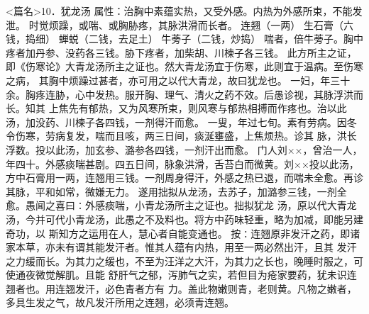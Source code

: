 \documentclass[a4paper,12pt,UTF8,twoside]{ctexbook}
\begin{document}
<篇名>10．犹龙汤
属性：治胸中素蕴实热，又受外感。内热为外感所束，不能发泄。 
时觉烦躁，或喘、或胸胁疼，其脉洪滑而长者。 
连翘（一两） 生石膏（六钱，捣细） 蝉蜕（二钱，去足土） 牛蒡子（二钱，炒捣） 
喘者，倍牛蒡子。胸中疼者加丹参、没药各三钱。胁下疼者，加柴胡、川楝子各三钱。 
此方所主之证，即《伤寒论》大青龙汤所主之证也。然大青龙汤宜于伤寒，此则宜于温病。至伤寒之病， 
其胸中烦躁过甚者，亦可用之以代大青龙，故曰犹龙也。 
一妇，年三十余。胸疼连胁，心中发热。服开胸、理气、清火之药不效。后愚诊视，其脉浮洪而长。知其 
上焦先有郁热，又为风寒所束，则风寒与郁热相搏而作疼也。治以此汤，加没药、川楝子各四钱，一剂得汗而愈。 
一叟，年过七旬。素有劳病。因冬令伤寒，劳病复发，喘而且咳，两三日间，痰涎壅盛，上焦烦热。诊其 
脉，洪长浮数。投以此汤，加玄参、潞参各四钱，一剂汗出而愈。 
门人刘××，曾治一人，年四十。外感痰喘甚剧。四五日间，脉象洪滑，舌苔白而微黄。刘××投以此汤， 
方中石膏用一两，连翘用三钱。一剂周身得汗，外感之热已退，而喘未全愈。再诊其脉，平和如常，微嫌无力。 
遂用拙拟从龙汤，去苏子，加潞参三钱，一剂全愈。愚闻之喜曰∶外感痰喘，小青龙汤所主之证也。拙拟犹龙 
汤，原以代大青龙汤，今并可代小青龙汤，此愚之不及料也。将方中药味轻重，略为加减，即能另建奇功，以 
斯知方之运用在人，慧心者自能变通也。 
按∶连翘原非发汗之药，即诸家本草，亦未有谓其能发汗者。惟其人蕴有内热，用至一两必然出汗，且其 
发汗之力缓而长。为其力之缓也，不至为汪洋之大汗，为其力之长也，晚睡时服之，可使通夜微觉解肌。且能 
舒肝气之郁，泻肺气之实，若但目为疮家要药，犹未识连翘者也。用连翘发汗，必色青者方有 
力。盖此物嫩则青，老则黄。凡物之嫩者，多具生发之气，故凡发汗所用之连翘，必须青连翘。 
\end{document}
